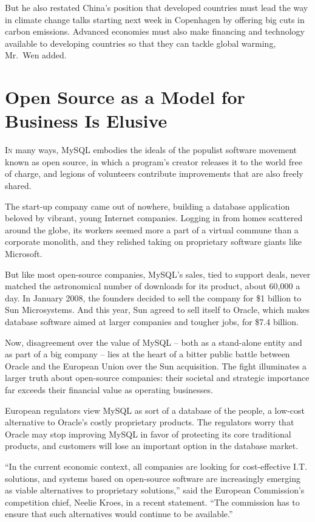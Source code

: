 ﻿\documentclass[12pt]{article}
\begin{document}
But he also restated China's position that developed countries must lead the way in climate change
talks starting next week in Copenhagen by offering big cuts in carbon emissions. Advanced economies
must also make financing and technology available to developing countries so that they can tackle
global warming, Mr.~Wen added.

\section{Open Source as a Model for Business Is Elusive\cite{elusive}}

\lettrine{I}{n} many ways, MySQL embodies the ideals of the populist
software movement known as open source, in which a program's creator releases it to the world free
of charge, and legions of volunteers contribute improvements that are also freely shared.

The start-up company came out of nowhere, building a database application beloved by vibrant, young
Internet companies. Logging in from homes scattered around the globe, its workers seemed more a part
of a virtual commune than a corporate monolith, and they relished taking on proprietary software
giants like Microsoft.

But like most open-source companies, MySQL's sales, tied to support deals, never matched the
astronomical number of downloads for its product, about 60,000 a day. In January 2008, the founders
decided to sell the company for \$1 billion to Sun Microsystems. And this year, Sun agreed to sell
itself to Oracle, which makes database software aimed at larger companies and tougher jobs, for
\$7.4 billion.

Now, disagreement over the value of MySQL -- both as a stand-alone entity and as part of a big
company -- lies at the heart of a bitter public battle between Oracle and the European Union over
the Sun acquisition. The fight illuminates a larger truth about open-source companies: their
societal and strategic importance far exceeds their financial value as operating businesses.

European regulators view MySQL as sort of a database of the people, a low-cost alternative to
Oracle's costly proprietary products. The regulators worry that Oracle may stop improving MySQL in
favor of protecting its core traditional products, and customers will lose an important option in
the database market.

``In the current economic context, all companies are looking for cost-effective I.T. solutions, and
systems based on open-source software are increasingly emerging as viable alternatives to
proprietary solutions,'' said the European Commission's competition chief, Neelie Kroes, in a recent
statement. ``The commission has to ensure that such alternatives would continue to be available.''
\end{document}

